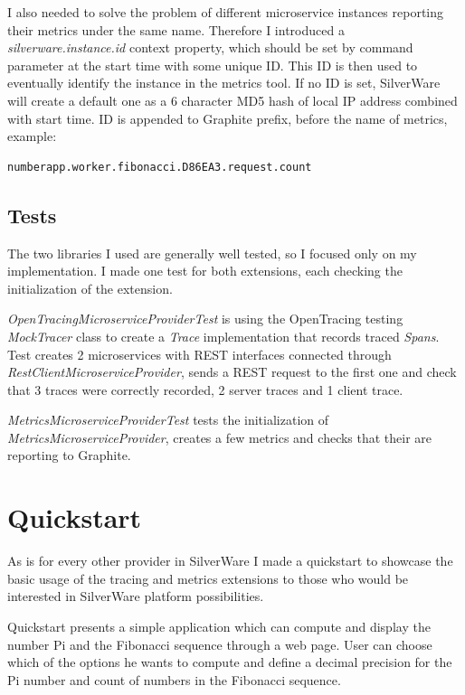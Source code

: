 \documentclass[12pt,oneside]{fithesis2}
\begin{document}
I also needed to solve the problem of different microservice instances reporting their metrics under the same name. Therefore I introduced a \textit{silverware.instance.id} context property, which should be set by command parameter at the start time with some unique ID. This ID is then used to eventually identify the instance in the metrics tool. If no ID is set, SilverWare will create a default one as a 6 character MD5 hash of local IP address combined with start time. ID is appended to Graphite prefix, before the name of metrics, example:
\newline

\begin{verbatim}
numberapp.worker.fibonacci.D86EA3.request.count
\end{verbatim}

\section{Tests}

The two libraries I used are generally well tested, so I focused only on my implementation. I made one test for both extensions, each checking the initialization of the extension.

\textit{OpenTracingMicroserviceProviderTest} is using the OpenTracing testing \textit{MockTracer} class to create a \textit{Trace} implementation that records traced \textit{Spans}. Test creates 2 microservices with REST interfaces connected through \textit{RestClientMicroserviceProvider}, sends a REST request to the first one and check that 3 traces were correctly recorded, 2 server traces and 1 client trace.

\textit{MetricsMicroserviceProviderTest} tests the initialization of \textit{MetricsMicroserviceProvider}, creates a few metrics and checks that their are reporting to Graphite.

\chapter{Quickstart}

As is for every other provider in SilverWare I made a quickstart to showcase the basic usage of the tracing and metrics extensions to those who would be interested in SilverWare platform possibilities.

Quickstart presents a simple application which can compute and display the number Pi and the Fibonacci sequence through a web page. User can choose which of the options he wants to compute and define a decimal precision for the Pi number and count of numbers in the Fibonacci sequence.
\end{document}
